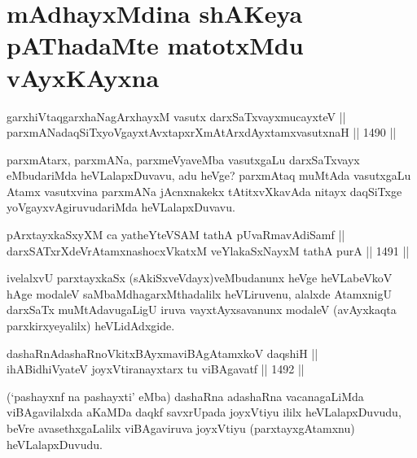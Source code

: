 \section*{mAdhayxMdina shAKeya pAThadaMte matotxMdu vAyxKAyxna}


\begin{shl}
garxhiVtaqgarxhaNagArxhayxM vasutx darxSaTxvayxmucayxteV || \\
parxmANadaqSiTxyoVgayxtAvxtapxrXmAtArxdAyxtamxvasutxnaH \hfill || 1490 ||  
\end{shl}

\begin{artha}
parxmAtarx, parxmANa, parxmeVyaveMba vasutxgaLu darxSaTxvayx eMbudariMda heVLalapxDuvavu, adu heVge? parxmAtaq muMtAda vasutxgaLu Atamx vasutxvina parxmANa jAcnxnakekx tAtitxvXkavAda nitayx daqSiTxge yoVgayxvAgiruvudariMda heVLalapxDuvavu.
\end{artha}

\begin{shl}
pArxtayxkaSxyXM ca yatheYteVSAM tathA pUvaRmavAdiSamf ||  \\
darxSATxrXdeVrAtamxnashocxVkatxM veYlakaSxNayxM tathA purA \hfill || 1491 ||  
\end{shl}

\begin{artha}
ivelalxvU parxtayxkaSx (sAkiSxveVdayx)veMbudanunx heVge heVLabeVkoV hAge modaleV saMbaMdhagarxMthadalilx heVLiruvenu, alalxde AtamxnigU darxSaTx muMtAdavugaLigU iruva vayxtAyxsavanunx modaleV (avAyxkaqta parxkirxyeyalilx) heVLidAdxgide.
\end{artha}


\begin{shl}
dashaRnAdashaRnoVkitxBAyxmaviBAgAtamxkoV daqshiH || \\
ihABidhiVyateV joyxVtiranayxtarx tu viBAgavatf \hfill || 1492 ||  
\end{shl}

\begin{artha}
(`pashayxnf na pashayxti' eMba) dashaRna adashaRna vacanagaLiMda viBAgavilalxda aKaMDa daqkf savxrUpada joyxVtiyu ililx heVLalapxDuvudu, beVre avasethxgaLalilx viBAgaviruva joyxVtiyu (parxtayxgAtamxnu) heVLalapxDuvudu.
\end{artha}

